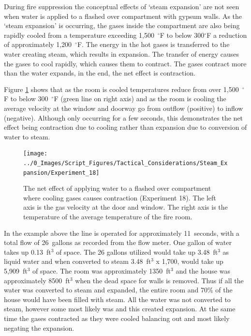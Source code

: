 \documentclass[12pt,oneside]{book}
\begin{document}
During fire suppression the conceptual effects of `steam expansion' are not seen when water is applied to a flashed over compartment with gypsum walls. As the `steam expansion' is occurring, the gases inside the compartment are also being rapidly cooled from a temperature exceeding 1,500~$^\circ$F to below 300$^\circ$F a reduction of approximately 1,200~$^\circ$F. The energy in the hot gases is transferred to the water creating steam, which results in expansion. The transfer of energy causes the gases to cool rapidly, which causes them to contract. The gases contract more than the water expands, in the end, the net effect is contraction.  

Figure \ref{fig:expansion_TC_chart} shows that as the room is cooled temperatures reduce from over 1,500~$^\circ$F to below 300~$^\circ$F (green line on right axis) and as the room is cooling the average velocity at the window and doorway go from outflow (positive) to inflow (negative). Although only occurring for a few seconds, this demonstrates the net effect being contraction due to cooling rather than expansion due to conversion of water to steam. 

\begin{figure}[H]
\centering
\texttt{[image: ../0\_Images/Script\_Figures/Tactical\_Considerations/Steam\_Expansion/Experiment\_18]}
\caption[Gas Contraction Due to Cooling - Exterior Attack]{The net effect of applying water to a flashed over compartment where cooling gases causes contraction (Experiment 18). The left axis is the gas velocity at the door and window. The right axis is the temperature of the average temperature of the fire room.}
\label{fig:expansion_TC_chart}
\end{figure}

In the example above the line is operated for approximately 11~seconds, with a total flow of 26~gallons as recorded from the flow meter. One gallon of water takes up 0.13~ft$^3$ of space. The 26 gallons utilized would take up 3.48~ft$^3$ as liquid water and when converted to steam 3.48~ft$^3$ x 1,700, would take up 5,909~ft$^3$ of space. The room was approximately 1350~ft$^3$ and the house was approximately 8500~ft$^3$ when the dead space for walls is removed. Thus if all the water was converted to steam and expanded, the entire room and 70\% of the house would have been filled with steam. All the water was not converted to steam, however some most likely was and this created expansion. At the same time the gases contracted as they were cooled balancing out and most likely negating the expansion. 
\end{document}
